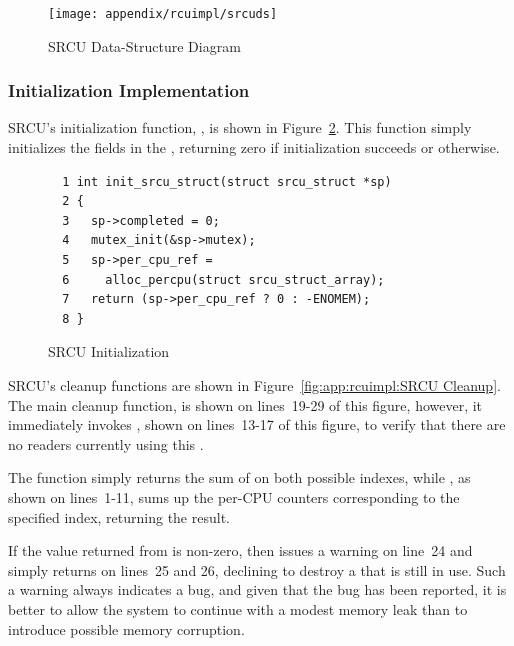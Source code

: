 \begin{figure}[htb]
\centering
\texttt{[image: appendix/rcuimpl/srcuds]}
\caption{SRCU Data-Structure Diagram}
\label{fig:app:whymb:SRCU Data-Structure Diagram}
\end{figure}

\subsubsection{Initialization Implementation}
\label{sec:app:rcuimpl:Initialization Implementation}

SRCU's initialization function, , is shown in
Figure~\ref{fig:app:rcuimpl:SRCU Initialization}.
This function simply initializes the fields in the
 , returning zero if initialization succeeds
or  otherwise.

\begin{figure}[htbp]
{ \scriptsize
\begin{verbatim}
  1 int init_srcu_struct(struct srcu_struct *sp)
  2 {
  3   sp->completed = 0;
  4   mutex_init(&sp->mutex);
  5   sp->per_cpu_ref =
  6     alloc_percpu(struct srcu_struct_array);
  7   return (sp->per_cpu_ref ? 0 : -ENOMEM);
  8 }
\end{verbatim}
}
\caption{SRCU Initialization}
\label{fig:app:rcuimpl:SRCU Initialization}
\end{figure}

SRCU's cleanup functions are shown in
Figure~\ref{fig:app:rcuimpl:SRCU Cleanup}.
The main cleanup function,  is shown
on lines~19-29 of this figure, however, it immediately invokes
, shown on lines~13-17 of this figure,
to verify that there are no readers currently using this
 .

The  function simply returns the sum of
 on both possible indexes,
while , as shown on lines~1-11,
sums up the per-CPU counters corresponding to the specified index,
returning the result.

If the value returned from  is non-zero,
then  issues a warning on line~24 and
simply returns on lines~25 and 26, declining to destroy a
  that is still in use.
Such a warning always indicates a bug, and given that the bug
has been reported, it is better to allow the system to continue
with a modest memory leak than to introduce possible memory corruption.

